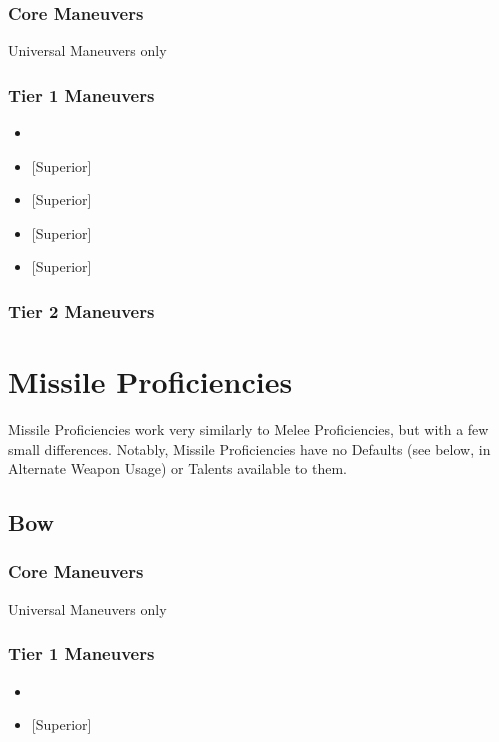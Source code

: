 \documentclass[oneside,11pt,english]{book}
\begin{document}
\subsubsection{Core Maneuvers}
Universal Maneuvers only

\subsubsection{Tier 1 Maneuvers}
\vspace{-5pt}\begin{itemize}
	[itemsep=0.5mm]
	\item {}
	\item {} [Superior] 
	\item {} [Superior] 
	\item {} [Superior] 
	\item {} [Superior] 
\end{itemize}
\subsubsection{Tier 2 Maneuvers}

\section{Missile Proficiencies}
Missile Proficiencies work very similarly to Melee Proficiencies, but with a few small differences. 
Notably, Missile Proficiencies have no Defaults (see below, in Alternate Weapon Usage) or Talents 
available to them. 

\subsection{Bow}
\subsubsection{Core Maneuvers}
Universal Maneuvers only 

\subsubsection{Tier 1 Maneuvers}
\vspace{-5pt}\begin{itemize}
	[itemsep=0.5mm]
	\item {}
	\item {} [Superior]
\end{itemize}
\end{document}
